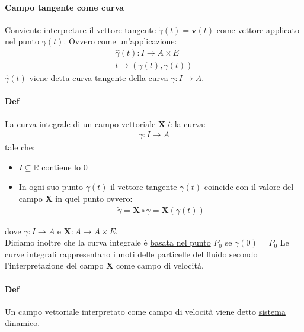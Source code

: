 \paragraph{Campo tangente come curva} Conviente interpretare il vettore tangente $\dot{\gamma}(t)=\mathbf{v}(t)$ come vettore applicato nel punto $\gamma(t)$. Ovvero come un'applicazione:
\begin{align*}
    \hat{\gamma}(t)\colon I \to A\times E\\
    t\mapsto (\gamma(t),\dot{\gamma}(t))
\end{align*}
$\hat{\gamma}(t)$ viene detta \underline{curva tangente} della curva $\gamma\colon I \to A$.
\paragraph{Def} La \underline{curva integrale} di un campo vettoriale $\mathbf{X}$ è la curva:
\begin{align*}
    \gamma \colon I \to A
\end{align*}
tale che:
\begin{itemize}
    \item $I\subseteq \mathbb{R}$ contiene lo $0$
    \item In ogni suo punto $\gamma(t)$ il vettore tangente $\dot{\gamma}(t)$ coincide con il valore del campo $\mathbf{X}$ in quel punto ovvero:
    \begin{align*}
        \dot{\gamma}=\mathbf{X}\circ \gamma=\mathbf{X}(\gamma(t))
    \end{align*}
\end{itemize}
dove $\gamma\colon I \to A$ e $\mathbf{X}\colon A \to A\times E$.\\
Diciamo inoltre che la curva integrale è \underline{basata nel punto} $P_0$ se $\gamma(0)=P_0$
Le curve integrali rappresentano i moti delle particelle del fluido secondo l'interpretazione del campo $\mathbf{X}$ come campo di velocità.\\
\paragraph{Def} Un campo vettoriale interpretato come campo di velocità viene detto \underline{sistema dinamico}.
